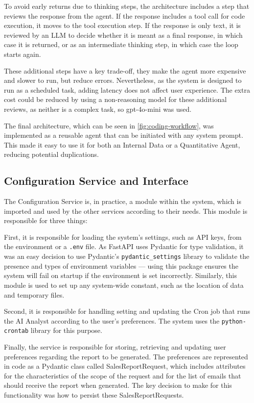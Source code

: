 \documentclass[a4paper]{report}
\begin{document}
To avoid early returns due to thinking steps, the architecture includes a step that reviews the response from the agent. If the response includes a tool call for code execution, it moves to the tool execution step. If the response is only text, it is reviewed by an LLM to decide whether it is meant as a final response, in which case it is returned, or as an intermediate thinking step, in which case the loop starts again.

These additional steps have a key trade-off, they make the agent more expensive and slower to run, but reduce errors. Nevertheless, as the system is designed to run as a scheduled task, adding latency does not affect user experience. The extra cost could be reduced by using a non-reasoning model for these additional reviews, as neither is a complex task, so gpt-4o-mini was used.

The final architecture, which can be seen in \autoref{fig:coding-workflow}, was implemented as a reusable agent that can be initiated with any system prompt. This made it easy to use it for both an Internal Data or a Quantitative Agent, reducing potential duplications.

\subsection{Configuration Service and Interface}
\label{subsec:config-implementation}

The Configuration Service is, in practice, a module within the system, which is imported and used by the other services according to their needs. This module is responsible for three things:

First, it is responsible for loading the system's settings, such as API keys, from the environment or a \texttt{.env} file. As FastAPI uses Pydantic for type validation, it was an easy decision to use Pydantic's \texttt{pydantic\_settings} library to validate the presence and types of environment variables --- using this package ensures the system will fail on startup if the environment is set incorrectly. Similarly, this module is used to set up any system-wide constant, such as the location of data and temporary files.

Second, it is responsible for handling setting and updating the Cron job that runs the AI Analyst according to the user's preferences. The system uses the \texttt{python-crontab} library for this purpose.

Finally, the service is responsible for storing, retrieving and updating user preferences regarding the report to be generated. The preferences are represented in code as a Pydantic class called SalesReportRequest, which includes attributes for the characteristics of the scope of the request and for the list of emails that should receive the report when generated. The key decision to make for this functionality was how to persist these SalesReportRequests.
\end{document}

